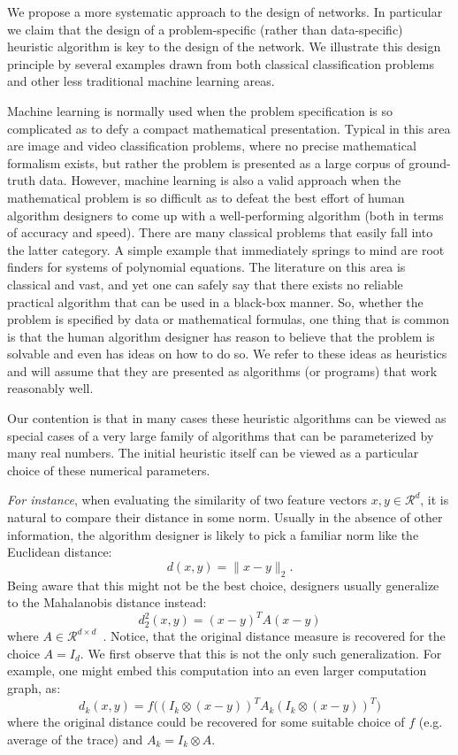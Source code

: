 \documentclass{article}
\begin{document}
We propose a more systematic approach to the design of networks. In particular we claim that the design of a problem-specific (rather than data-specific) heuristic algorithm is key to the design of the network. We illustrate this design principle by several examples drawn from both classical classification problems and other less traditional machine learning areas.

Machine learning is normally used when the problem specification is so complicated as to defy a compact mathematical presentation. Typical in this area are image and video classification problems, where no precise mathematical formalism exists, but rather the problem is presented as a large corpus of ground-truth data. However, machine learning is also a valid approach when the mathematical problem is so difficult as to defeat the best effort of human algorithm designers to come up with a well-performing algorithm (both in terms of accuracy and speed). There are many classical problems that easily fall into the latter category. A simple example that immediately springs to mind are root finders for systems of polynomial equations. The literature on this area is classical and vast, and yet one can safely say that there exists no reliable practical algorithm that can be used in a black-box manner.
So, whether the problem is specified by data or mathematical formulas, one thing that is common is that the human algorithm designer has reason to believe that the problem is solvable and even has ideas on how to do so. We refer to these ideas as heuristics and will assume that they are presented as algorithms (or programs) that work reasonably well.

Our contention is that in many cases these heuristic algorithms can be viewed as special cases of a very large family of algorithms that can be parameterized by many real numbers. The initial heuristic itself can be viewed as a particular choice of these numerical parameters.

\textit{For instance}, when evaluating the similarity of two feature vectors $x,y \in \mathcal{R}^d$, it is natural to compare their distance in some norm. Usually in the absence of other information, the algorithm designer is likely to pick a familiar norm like the Euclidean distance:
\[
    d(x,y) = \|x-y\|_2.
\]
Being aware that this might not be the best choice, designers usually generalize to the Mahalanobis distance instead:
\[
    d^2_2(x,y) = (x-y)^T A (x-y)
\]
where $A\in\mathcal{R}^{d \times d}$~\cite{mignon2012pcca}. Notice, that the original distance measure is recovered for the choice $A=I_d$. We first observe that this is not the only such generalization. For example, one might embed this computation into an even larger computation graph, as:
\[
    d_k(x,y) = f\big( (I_k \otimes (x-y))^T A_k (I_k \otimes (x-y))^T \big)
\]
where the original distance could be recovered for some suitable choice of $f$ (e.g. average of the trace) and $A_k = I_k \otimes A$.
\end{document}
